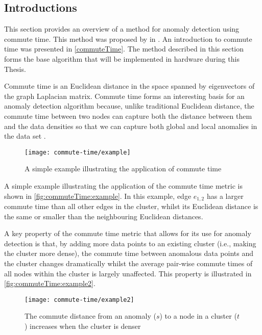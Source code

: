 \subsection{Introductions}
\label{anomalyDetection:commuteTime:introduction}
This section provides an overview of a method for anomaly detection using
commute time. This method was proposed by \citeauthor{Khoa:2012} in
 \cite{Khoa:2012}. An introduction to commute time was
presented in \autoref{commuteTime}. The method described in this section forms
the base algorithm that will be implemented in hardware during this Thesis.

Commute time is an Euclidean distance in the space spanned by eigenvectors of
the graph Laplacian matrix. Commute time forms an interesting basis for an
anomaly detection algorithm because, unlike traditional Euclidean distance,
the commute time between two nodes can capture both the distance between them
and the data densities so that we can capture both global and local anomalies in
the data set \cite{Khoa:2012}.

\begin{figure}
    \centering
    \texttt{[image: commute-time/example]}
    \caption{A simple example illustrating the application of commute time
        \cite{Khoa:2012}}
    \label{fig:commuteTime:example}
\end{figure}

A simple example illustrating the application of the commute time metric is
shown in \autoref{fig:commuteTime:example}. In this example, edge $e_{1,2}$ has
a larger commute time than all other edges in the cluster, whilst its Euclidean
distance is the same or smaller than the neighbouring Euclidean distances.

A key property of the commute time metric that allows for its use for anomaly
detection is that, by adding more data points to an existing cluster (i.e.,
making the cluster more dense), the commute time between anomalous data points
and the cluster changes dramatically whilst the average pair-wise commute times
of all nodes within the cluster is largely unaffected. This property is
illustrated in \autoref{fig:commuteTime:example2}.

\begin{figure}
    \centering
    \texttt{[image: commute-time/example2]}
    \caption{The commute distance from an anomaly ($s$) to a node in a cluster
        ($t$) increases when the cluster is denser \cite{Khoa:2012}}
    \label{fig:commuteTime:example2}
\end{figure}


